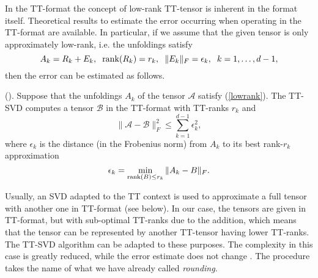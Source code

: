 \documentclass{siamart190516}
\newcommand{\cc}[1]{\mathcal{#1}}
\begin{document}
In the TT-format the concept of low-rank TT-tensor is inherent in the format itself.
Theoretical results to estimate the error occurring when operating in the TT-format are available. In particular, if we assume that the given tensor is only approximately low-rank, i.e. the unfoldings satisfy
\begin{equation}\label{lowrank}
    A_k = R_k+E_k, \hspace{.2cm} {\rm rank}(R_k) = r_k, \hspace{.2cm} \|E_k\|_F=\epsilon_k, \hspace{.2cm}k=1,\ldots,d-1,
\end{equation}
then the error can be estimated as follows.
%
\begin{theorem}{\rm (\cite{OSELEDETS201070})}.
    Suppose that the unfoldings $A_k$ of the tensor $\cc{A}$ satisfy (\ref{lowrank}). The TT-SVD computes a tensor $\cc{B}$ in the TT-format with TT-ranks $r_k$ and
    \begin{equation}
        \|\cc{A}-\cc{B}\|_F^2\le \sum_{k=1}^{d-1}\epsilon_k^2 ,
    \end{equation}
    where $\epsilon_k$ is the distance (in the Frobenius norm) from $A_k$ to its best rank-$r_k$ approximation 
    \[
    \epsilon_k = \min_{{\rm rank}(B)\le r_k}\|A_k - B\|_F.
    \]
\end{theorem}
Usually, an SVD adapted to the TT context is used to approximate a full tensor with another one in TT-format (see below). In our case, the tensors are given in TT-format, but with sub-optimal TT-ranks due to the addition, which means that the tensor can be represented by another TT-tensor having lower TT-ranks. The TT-SVD algorithm can be adapted to these purposes. The complexity in this case is greatly reduced, while the error estimate does not change \cite{Oseledets.2011}. 
The procedure takes the name of what we have already called \textit{rounding}.
\end{document}
